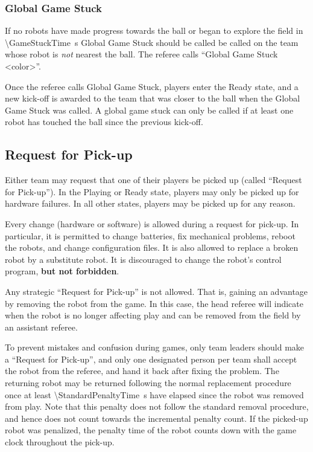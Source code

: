 \subsubsection{Global Game Stuck}
\label{sec:game_stuck:global}

If no robots have made progress towards the ball or began to explore the field in \qty{\GameStuckTime}{\second} Global Game Stuck should be called be called on the team whose robot is \textit{not} nearest the ball.
The referee calls ``Global Game Stuck \textless color\textgreater''.

Once the referee calls Global Game Stuck, players enter the Ready state, and a new kick-off is awarded to the team that was closer to the ball when the Global Game Stuck was called. A global game stuck can only be called if at least one robot has touched the ball since the previous kick-off.

\subsection{Request for Pick-up}
\label{sec:request_for_pickup}

Either team may request that one of their players be picked up (called ``Request for Pick-up'').
In the Playing or Ready state, players may only be picked up for hardware failures.
In all other states, players may be picked up for any reason.

Every change (hardware or software) is allowed during a request for pick-up. In particular,
it is permitted to change batteries, fix mechanical problems, reboot the robots, and change configuration files.
It is also allowed to replace a broken robot by a substitute robot.
It is discouraged to change the robot's control program, \textbf{but not forbidden}.

Any strategic ``Request for Pick-up'' is not allowed.
That is, gaining an advantage by removing the robot from the game.
In this case, the head referee will indicate when the robot is no longer affecting play and can be removed from the field by an assistant referee.

To prevent mistakes and confusion during games, only team leaders should make a ``Request for Pick-up'', and only one designated person per team shall accept the robot from the referee, and hand it back after fixing the problem.
The returning robot may be returned following the normal replacement procedure once at least \qty{\StandardPenaltyTime}{\second} have elapsed since the robot was removed from play.
Note that this penalty does not follow the standard removal procedure, and hence does not count towards the incremental penalty count.
If the picked-up robot was penalized, the penalty time of the robot counts down with the game clock throughout the pick-up.

